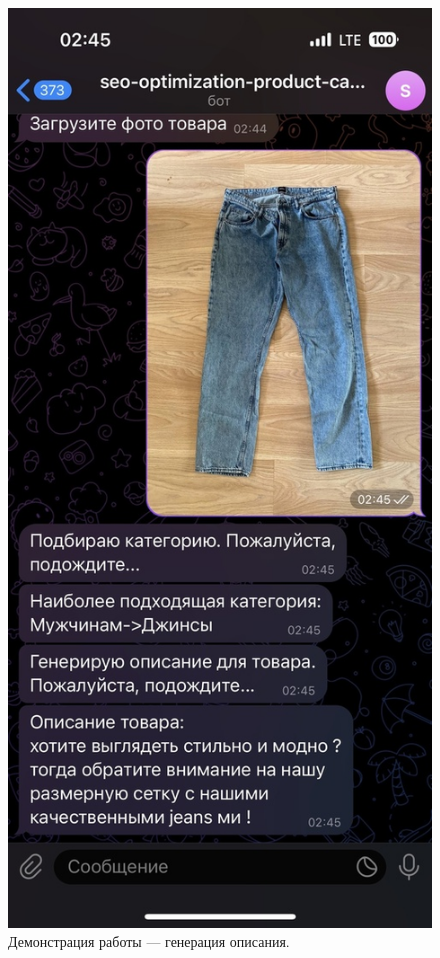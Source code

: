 \documentclass[a4paper,12pt]{extarticle}
\begin{document}
\begin{figure}[ht]
\begin{minipage}[b]{3in}
		\label{fig:telegram-jeans-menu}
	\end{minipage}
	\hfill
	\begin{minipage}[b]{3in}
		\centering
		\includegraphics[scale=0.35]{telegram-jeans-description.png}
		\caption{Демонстрация работы — генерация описания.}
		\label{fig:telegram-jeans-description}
	\end{minipage}
\end{figure}
\end{document}
